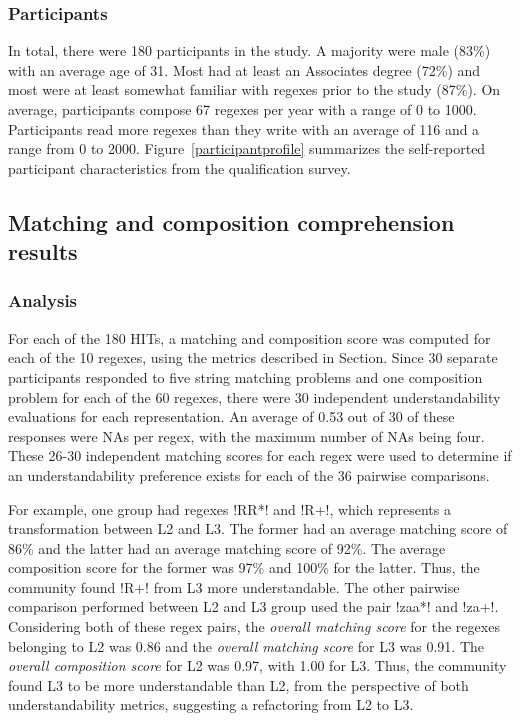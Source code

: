 \subsubsection{Participants}

In total, there were 180 participants in the study.
A majority were male (83\%) with an average age of 31. Most had
at least an Associates degree (72\%) and most were at least somewhat familiar with regexes prior to the study (87\%). On average,
participants compose 67 regexes per year with a range of 0 to 1000.
Participants read more regexes than they write with an average of 116 and a range from 0 to 2000.
Figure~\ref{participantprofile} summarizes the self-reported participant characteristics from the qualification survey.

\subsection{Matching and composition comprehension results}



\subsubsection{Analysis}
For each of the 180 HITs, a matching and composition score was computed for each of the 10 regexes, using the metrics described in Section.  Since 30 separate participants responded to five string matching problems and one composition problem for each of the 60 regexes, there were 30 independent understandability evaluations for each representation.  An average of 0.53 out of 30 of these responses were NAs per regex, with the maximum number of NAs being four.  These 26-30 independent matching scores for each regex were used to determine if an understandability preference exists for each of the 36 pairwise comparisons.

For example, one group had regexes \cverb!RR*! and \cverb!R+!, which  represents a transformation between L2 and L3. The former had an average matching score of 86\% and the latter had an average matching score of 92\%. The average composition score for the former was 97\% and 100\% for the latter. Thus, the community found \cverb!R+! from L3 more understandable.
The other pairwise comparison performed between L2 and L3 group used the pair \cverb!zaa*! and \cverb!za+!.
Considering both of these regex pairs, the \emph{overall matching score} for the regexes belonging to L2 was 0.86 and the \emph{overall matching score} for L3 was 0.91.
The \emph{overall composition score} for L2 was 0.97, with 1.00 for L3. Thus, the community found L3 to be more understandable than L2, from the perspective of both understandability metrics, suggesting a refactoring from L2 to L3.

